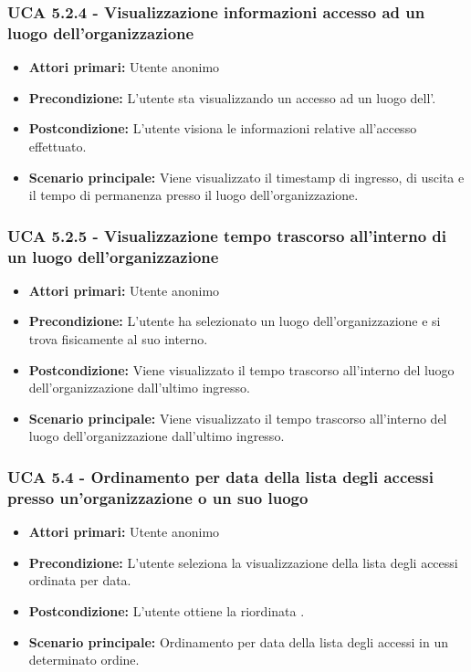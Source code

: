 \subsubsection{UCA 5.2.4 - Visualizzazione informazioni accesso ad un luogo dell'organizzazione}
\begin{itemize}
	\item \textbf{Attori primari:} Utente anonimo
	\item \textbf{Precondizione:} L'utente sta visualizzando un accesso ad un luogo dell'.
	\item \textbf{Postcondizione:} L'utente visiona le informazioni relative all'accesso effettuato.
	\item \textbf{Scenario principale:} Viene visualizzato il timestamp di ingresso, di uscita e il tempo di permanenza presso  il luogo dell'organizzazione.
\end{itemize}

\subsubsection{UCA 5.2.5 - Visualizzazione tempo trascorso all'interno di un luogo dell'organizzazione}
\begin{itemize}
	\item \textbf{Attori primari:} Utente anonimo
	\item \textbf{Precondizione:} L'utente ha selezionato un luogo dell'organizzazione e si trova fisicamente al suo interno.
	\item \textbf{Postcondizione:} Viene visualizzato il tempo trascorso all'interno del luogo dell'organizzazione dall'ultimo ingresso.
	\item \textbf{Scenario principale:} Viene visualizzato il tempo trascorso all'interno del luogo dell'organizzazione dall'ultimo ingresso.
\end{itemize}

\subsubsection{UCA 5.4 - Ordinamento per data della lista degli accessi presso un'organizzazione o un suo luogo}
\begin{itemize}
    \item \textbf{Attori primari:} Utente anonimo
    \item \textbf{Precondizione:} L'utente seleziona la visualizzazione della lista degli accessi ordinata per data.
    \item \textbf{Postcondizione:} L'utente ottiene la  riordinata .
    \item \textbf{Scenario principale:} Ordinamento per data della lista degli accessi in un determinato ordine.
\end{itemize}

